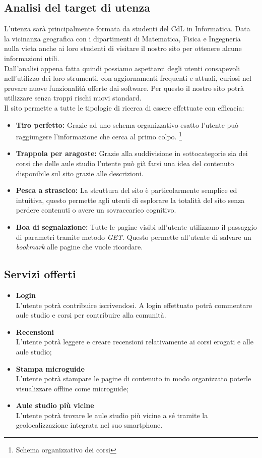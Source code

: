 \subsection{Analisi del target di utenza}

L'utenza sarà principalmente formata da studenti del CdL in Informatica. Data la vicinanza geografica con i dipartimenti di Matematica, Fisica e Ingegneria nulla vieta anche ai loro studenti di visitare il nostro sito per ottenere alcune informazioni utili.\\
Dall'analisi appena fatta quindi possiamo aspettarci degli utenti consapevoli nell'utilizzo dei loro strumenti, con aggiornamenti frequenti e attuali, curiosi nel provare nuove funzionalità offerte dai software. Per questo il nostro sito potrà utilizzare senza troppi rischi nuovi standard.\\
Il sito permette a tutte le tipologie di ricerca di essere effettuate con
efficacia:
\begin{itemize}
    \item \textbf{Tiro perfetto:} Grazie ad uno schema organizzativo esatto l'utente può raggiungere l'informazione che cerca al primo colpo. \footnote{Schema organizzativo dei corsi}
    \item \textbf{Trappola per aragoste:} Grazie alla suddivisione in sottocategorie sia dei corsi che delle aule studio l'utente può già farsi una idea del contenuto disponibile sul sito grazie alle descrizioni.
    \item \textbf{Pesca a strascico:} La struttura del sito è particolarmente semplice ed intuitiva, questo permette agli utenti di esplorare la totalità del sito senza perdere contenuti o avere un sovraccarico cognitivo.
    \item \textbf{Boa di segnalazione:} Tutte le pagine visibi all'utente utilizzano il passaggio di parametri tramite metodo \textit{GET}. Questo permette all'utente di salvare un \textit{bookmark} alle pagine che vuole ricordare.
\end{itemize}

\subsection{Servizi offerti}
\begin{itemize}
    \item \textbf{Login} \\ L'utente potrà contribuire iscrivendosi. A login effettuato potrà commentare aule studio e corsi per contribuire alla comunità.
    \item \textbf{Recensioni} \\ L'utente potrà leggere e creare recensioni relativamente ai corsi erogati e alle aule studio;
    \item \textbf{Stampa microguide} \\ L'utente potrà stampare le pagine di contenuto in modo organizzato poterle visualizzare offline come microguide;
    \item \textbf{Aule studio più vicine} \\ L'utente potrà trovare le aule studio più vicine a sé tramite la geolocalizzazione integrata nel suo smartphone.
\end{itemize}
